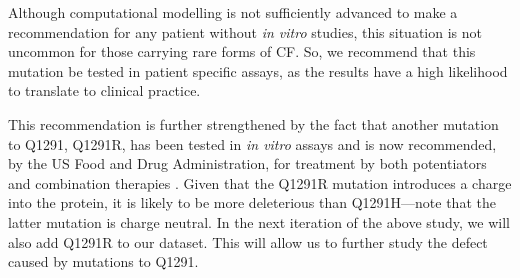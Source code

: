Although computational modelling is not sufficiently advanced to make a recommendation for any patient without \textit{in vitro} studies, this situation is not uncommon for those carrying rare forms of CF. So, we recommend that this mutation be tested in patient specific assays, as the results have a high likelihood to translate to clinical practice. 

This recommendation is further strengthened by the fact that another mutation to Q1291, Q1291R, has been tested in \textit{in vitro} assays and is now recommended, by the US Food and Drug Administration, for treatment by both potentiators and combination therapies \cite{trikafta_website, trikafta_FDA_info, kalydeco_FDA_approval}. Given that the Q1291R mutation introduces a charge into the protein, it is likely to be more deleterious than Q1291H---note that the latter mutation is charge neutral. In the next iteration of the above study, we will also add Q1291R to our dataset. This will allow us to further study the defect caused by mutations to Q1291. 


